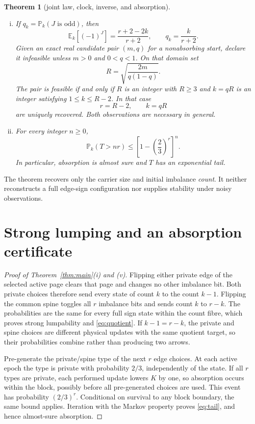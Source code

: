 \documentclass[a4paper,10pt]{amsart}
\newtheorem{theorem}{Theorem}
\theoremstyle{remark}
\newcommand{\Prob}{\mathbb P}
\newcommand{\E}{\mathbb E}
\begin{document}
\begin{theorem}[joint law, clock, inverse, and absorption]
\begin{enumerate}[(i)]
\item If $q_k=\Prob_k(J\text{ is odd})$, then
\begin{equation}\label{eq:parity}
 \E_k[(-1)^J]=\frac{r+2-2k}{r+2},
 \qquad q_k=\frac{k}{r+2}.
\end{equation}
Given an exact real candidate pair $(m,q)$ for a nonabsorbing start, declare
it infeasible unless $m>0$ and $0<q<1$.  On that domain set
\begin{equation}\label{eq:R}
 R=\sqrt{\frac{2m}{q(1-q)}}.
\end{equation}
The pair is feasible if and only if $R$ is an integer with $R\geq3$ and
$k=qR$ is an integer satisfying $1\leq k\leq R-2$.  In that case
\begin{equation}\label{eq:inverse}
 r=R-2,\qquad k=qR
\end{equation}
are uniquely recovered.  Both observations are necessary in general.

\item For every integer $n\geq0$,
\begin{equation}\label{eq:tail}
 \Prob_k(T>nr)\leq\left[1-\left(\frac23\right)^r\right]^n.
\end{equation}
In particular, absorption is almost sure and $T$ has an exponential tail.
\end{enumerate}
\end{theorem}

The theorem recovers only the carrier size and initial imbalance \emph{count}.
It neither reconstructs a full edge-sign configuration nor supplies stability
under noisy observations.

\section{Strong lumping and an absorption certificate}\label{sec:lumping}

\begin{proof}[Proof of Theorem~\ref{thm:main}(i) and (v)]
Flipping either private edge of the selected active page clears that page and
changes no other imbalance bit.  Both private choices therefore send every
state of count $k$ to the count $k-1$.  Flipping the common spine toggles all
$r$ imbalance bits and sends count $k$ to $r-k$.  The probabilities are the
same for every full sign state within the count fibre, which proves strong
lumpability and \eqref{eq:quotient}.  If $k-1=r-k$, the private and spine
choices are different physical updates with the same quotient target, so
their probabilities combine rather than producing two arrows.

Pre-generate the private/spine type of the next $r$ edge choices.  At each
active epoch the type is private with probability $2/3$, independently of the
state.  If all $r$ types are private, each performed update lowers $K$ by one,
so absorption occurs within the block, possibly before all pre-generated
choices are used.  This event has probability $(2/3)^r$.  Conditional on
survival to any block boundary, the same bound applies.  Iteration with the
Markov property proves \eqref{eq:tail}, and hence almost-sure absorption.
\end{proof}
\end{document}
